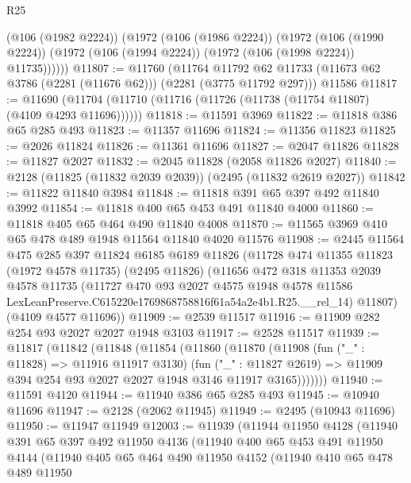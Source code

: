 \begin{lexlean}{R25}
\begin{coremodule}
        (@106 (@1982 @2224))
        (@1972
          (@106 (@1986 @2224))
          (@1972
            (@106 (@1990 @2224))
            (@1972 (@106 (@1994 @2224)) (@1972 (@106 (@1998 @2224)) @11735))))))
@11807 := @11760
    (@11764 @11792 @62 @11733 (@11673 @62 @3786 (@2281 (@11676 @62))) (@2281 (@3775 @11792 @297)))
    @11586
@11817 := @11690 (@11704 (@11710 (@11716 (@11726 (@11738 (@11754 @11807) (@4109 @4293 @11696))))))
@11818 := @11591 @3969
@11822 := @11818 @386 @65 @285 @493
@11823 := @11357 @11696
@11824 := @11356 @11823
@11825 := @2026 @11824
@11826 := @11361 @11696
@11827 := @2047 @11826
@11828 := @11827 @2027
@11832 := @2045 @11828 (@2058 @11826 @2027)
@11840 := @2128 (@11825 (@11832 @2039 @2039)) (@2495 (@11832 @2619 @2027))
@11842 := @11822 @11840 @3984
@11848 := @11818 @391 @65 @397 @492 @11840 @3992
@11854 := @11818 @400 @65 @453 @491 @11840 @4000
@11860 := @11818 @405 @65 @464 @490 @11840 @4008
@11870 := @11565 @3969 @410 @65 @478 @489 @1948 @11564 @11840 @4020 @11576
@11908 := @2445
    @11564
    @475
    @285
    @397
    @11824
    @6185
    @6189
    @11826
    (@11728
      @474
      @11355
      @11823
      (@1972 @4578 @11735)
      (@2495 @11826)
      (@11656
        @472
        @318
        @11353
        @2039
        @4578
        @11735
        (@11727
          @470
          @93
          @2027
          @4575
          @1948
          @4578
          @11586
          LexLeanPreserve.C615220e1769868758816f61a54a2e4b1.R25.__rel_14)
        @11807)
      (@4109 @4577 @11696))
@11909 := @2539 @11517
@11916 := @11909 @282 @254 @93 @2027 @2027 @1948 @3103
@11917 := @2528 @11517
@11939 := @11817
    (@11842
      (@11848
        (@11854
          (@11860
            (@11870
              (@11908
                (fun ("_" : @11828) => @11916 @11917 @3130)
                (fun ("_" : @11827 @2619) =>
                @11909 @394 @254 @93 @2027 @2027 @1948 @3146 @11917 @3165)))))))
@11940 := @11591 @4120
@11944 := @11940 @386 @65 @285 @493
@11945 := @10940 @11696
@11947 := @2128 (@2062 @11945)
@11949 := @2495 (@10943 @11696)
@11950 := @11947 @11949
@12003 := @11939
    (@11944
      @11950
      @4128
      (@11940
        @391
        @65
        @397
        @492
        @11950
        @4136
        (@11940
          @400
          @65
          @453
          @491
          @11950
          @4144
          (@11940
            @405
            @65
            @464
            @490
            @11950
            @4152
            (@11940
              @410
              @65
              @478
              @489
              @11950

\end{coremodule}
\end{lexlean}
